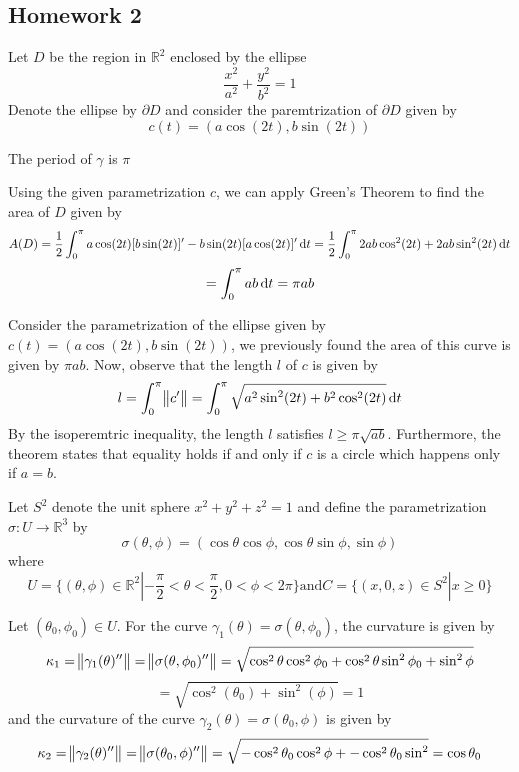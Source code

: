 
\subsection{Homework 2}

\begin{problem}
  Let \(D\) be the region in \(\mathbb{R}^{2}\) enclosed by the ellipse
  \[
\frac{x^{2}}{a^{2}} + \frac{y^{2}}{b^{2}} = 1
\]
  Denote the ellipse by \(\partial D\) and consider the paremtrization of \(\partial {D}\) given by
  \[
c(t) = (a\cos(2t), b\sin(2t))
\]
\end{problem}

\begin{solution}
  The period of \(\gamma\) is \(\pi\)
\end{solution}

\begin{solution}
  Using the given parametrization \(c\), we can apply Green's Theorem to find the area of \(D\) given by
  \[
A(D) = \frac{1}{2}\int^{\pi}_{0} a\cos(2t)[b\sin(2t)]' - b\sin(2t)[a\cos(2t)]'\dif t = \frac{1}{2}\int^{\pi}_{0} 2ab\cos^{2}(2t) + 2ab\sin^{2}(2t) \dif t
\]
  \[
= \int^{\pi}_{0} ab \dif t = \pi ab
\]
\end{solution}

\begin{solution}
  Consider the parametrization of the ellipse given by \(c(t) = (a\cos(2t), b\sin(2t))\), we previously found the area of this curve is given by \(\pi ab\). Now, observe that the length \(l\) of \(c\) is given by
  \[
l = \int^{\pi}_{0}\norm{c'} = \int^{\pi}_{0}\sqrt{a^{2}\sin^{2}(2t)+b^{2}\cos^{2}(2t)}\dif t
\]
By the isoperemtric inequality, the length \(l\) satisfies \(l \geq \pi \sqrt{ab}\). Furthermore, the theorem states that equality holds if and only if \(c\) is a circle which happens only if \(a = b\).
\end{solution}

\begin{problem}
  Let \(S^{2}\) denote the unit sphere \(x^{2} + y^{2} + z^{2} = 1\) and define the parametrization \(\sigma \colon U\rightarrow \mathbb{R}^{3}\) by
  \[
\sigma(\theta, \phi) = (\cos \theta \cos \phi, \cos \theta \sin \phi, \sin \phi)
\]
  where
  \[
U = \{(\theta,\phi) \in \mathbb{R}^{2} | -\frac{\pi}{2} < \theta < \frac{\pi}{2}, 0 < \phi < 2\pi\} \text{and} C = \{(x,0,z) \in S^{2} | x \geq 0 \}
\]
\end{problem}

\begin{solution}
  Let \((\theta_{0}, \phi_{0}) \in U\). For the curve \(\gamma_{1}(\theta) = \sigma(\theta, \phi_{0})\), the curvature is given by
  \[
\kappa_{1} = \norm{\gamma_{1}(\theta)''} = \norm{\sigma(\theta, \phi_{0})''} = \sqrt{\cos^{2}\theta \cos^{2}\phi_{0} + \cos^{2}\theta \sin^{2}\phi_{0} + \sin^{2}\phi}
\]
  \[
= \sqrt{\cos^{2}(\theta_{0}) + \sin^{2}(\phi)} = 1
\]
  and the curvature of the curve \(\gamma_{2}(\theta) = \sigma(\theta_{0}, \phi)\) is given by
  \[
\kappa_{2} = \norm{\gamma_{2}(\theta)''} = \norm{\sigma(\theta_{0}, \phi)''} = \sqrt{-\cos^{2}\theta_{0}\cos^{2}\phi + -\cos^{2}\theta_{0} \sin^{2}} = \cos\theta_{0}
\]
\end{solution}
